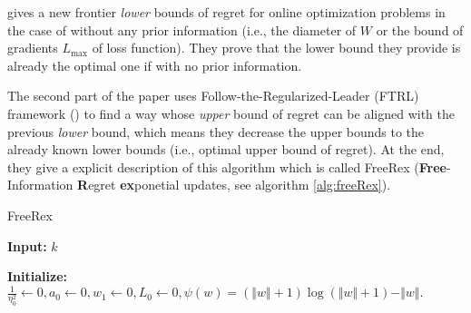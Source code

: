 \cite{Cutkosky2017} gives a new frontier \textit{lower} bounds of regret for online optimization problems in the case of without any prior information (i.e., the diameter of $W$ or the bound of gradients $L_{\max}$ of loss function). They prove that the lower bound they provide is already the optimal one if with no prior information. 

The second part of the paper uses Follow-the-Regularized-Leader (FTRL) framework (\cite{shalev2012online}) to find a way whose \textit{upper} bound of regret can be aligned with the previous \textit{lower} bound, which means they decrease the upper bounds to the already known lower bounds (i.e., optimal upper bound of regret). At the end, they give a explicit description of this algorithm  which is called FreeRex (\textbf{Free}-Information \textbf{R}egret \textbf{ex}ponetial updates, see algorithm \ref{alg:freeRex}).
\begin{algorithm}
\caption{FreeRex}
\label{alg:freeRex}
{\bfseries Input:} $k$

{\bfseries Initialize:} $\frac{1}{\eta_0^2} \leftarrow 0, a_0 \leftarrow 0, w_1 \leftarrow 0, L_0 \leftarrow 0, \psi(w) = (\Vert w \Vert + 1)\log(\Vert w \Vert + 1) - \Vert w \Vert.$
\begin{algorithmic}[1]
\EndFor
\end{algorithmic}
\end{algorithm}
